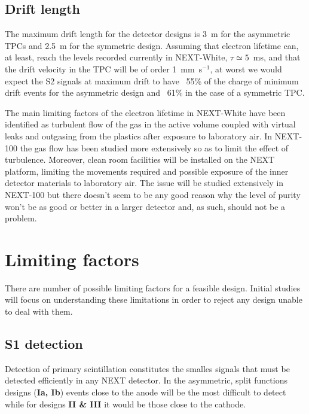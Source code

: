 \documentclass[11pt,a4paper]{article}
\begin{document}
\subsection{Drift length}
\label{subSec:drift}
The maximum drift length for the detector designs is 3~m for the asymmetric TPCs and 2.5~m for the symmetric design. Assuming that electron lifetime can, at least, reach the levels recorded currently in NEXT-White, $\tau \simeq 5$~ms, and that the drift velocity in the TPC will be of order 1~mm~\textmu s$^{-1}$, at worst we would expect the S2 signals at maximum drift to have ~55\% of the charge of minimum drift events for the asymmetric design and ~61\% in the case of a symmetric TPC.

The main limiting factors of the electron lifetime in NEXT-White have been identified as turbulent flow of the gas in the active volume coupled with virtual leaks and outgasing from the plastics after exposure to laboratory air. In NEXT-100 the gas flow has been studied more extensively so as to limit the effect of turbulence. Moreover, clean room facilities will be installed on the NEXT platform, limiting the movements required and possible exposure of the inner detector materials to laboratory air. The issue will be studied extensively in NEXT-100 but there doesn't seem to be any good reason why the level of purity  won't be as good or better in a larger detector and, as such, should not be a problem.

\section{Limiting factors}
\label{sec:limit}
There are number of possible limiting factors for a feasible design. Initial studies will focus on understanding these limitations in order to reject any design unable to deal with them.

\subsection{S1 detection}
\label{subSec:S1det}
Detection of primary scintillation constitutes the smalles signals that must be detected efficiently in any NEXT detector. In the asymmetric, split functions designs ({\bf Ia, Ib}) events close to the anode will be the most difficult to detect while for designs {\bf II \& III} it would be those close to the cathode.
\end{document}
